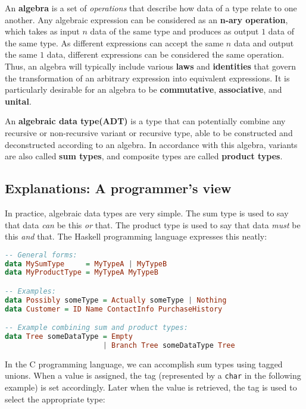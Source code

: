 \documentclass[12pt,a4paper]{article}
\begin{document}
		An \textbf{algebra} is a set of \textit{operations} that describe how data of a type relate to one another. Any algebraic expression can be considered as an \textbf{n-ary operation}, which takes as input $n$ data of the same type and produces as output $1$ data of the same type. As different expressions can accept the same $n$ data and output the same $1$ data, different expressions can be considered the same operation. Thus, an algebra will typically include various \textbf{laws} and \textbf{identities} that govern the transformation of an arbitrary expression into equivalent expressions. It is particularly desirable for an algebra to be \textbf{commutative}, \textbf{associative}, and \textbf{unital}.
		
		An \textbf{algebraic data type(ADT)} is a type that can potentially combine any recursive or non-recursive variant or recursive type, able to be constructed and deconstructed according to an algebra. In accordance with this algebra, variants are also called \textbf{sum types}, and composite types are called \textbf{product types}.
		
		\pagebreak
		\subsection{Explanations: A programmer's view}
		
		In practice, algebraic data types are very simple. The sum type is used to say that data \textit{can} be this \textit{or} that. The product type is used to say that data \textit{must} be this \textit{and} that. The Haskell programming language expresses this neatly:
		
		\begin{lstlisting}[language=Haskell]
-- General forms:
data MySumType     = MyTypeA | MyTypeB
data MyProductType = MyTypeA MyTypeB

-- Examples:
data Possibly someType = Actually someType | Nothing
data Customer = ID Name ContactInfo PurchaseHistory

-- Example combining sum and product types:
data Tree someDataType = Empty
                       | Branch Tree someDataType Tree
		\end{lstlisting}
		
		In the C programming language, we can accomplish sum types using tagged unions. When a value is assigned, the tag (represented by a \texttt{char} in the following example) is set accordingly. Later when the value is retrieved, the tag is used to select the appropriate type:
		
\end{document}

